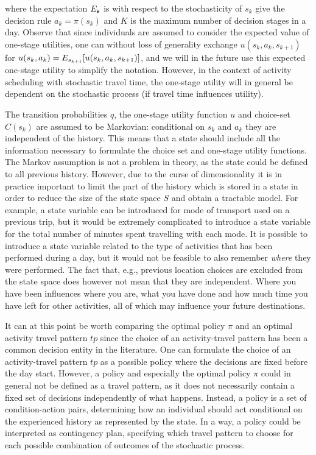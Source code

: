 where the expectation $E_{\mathbf{s}}$ is with respect to the stochasticity of $s_k$ give the decision rule $a_k=\pi({s_k})$ and $K$ is the maximum number of decision stages in a day. Observe that since individuals are assumed to consider the expected value of one-stage utilities, one can without loss of generality exchange $u(s_k,a_k,s_{k+1})$ for $u(s_k,a_k) = E_{s_{k+1}}[u(s_k,a_k,s_{k+1})]$, and we will in the future use this expected one-stage utility to simplify the notation. However, in the context of activity scheduling with stochastic travel time, the one-stage utility will in general be dependent on the stochastic process (if travel time influences utility).

The transition probabilities $q$, the one-stage utility function $u$ and choice-set $C(s_k)$ are assumed to be Markovian: conditional on $s_k$ and $a_k$ they are independent of the history. This means that a state should include all the information necessary to formulate the choice set and one-stage utility functions. The Markov assumption is not a problem in theory, as the state could be defined to all previous history. However, due to the curse of dimensionality it is in practice important to limit the part of the history which is stored in a state in order to reduce the size of the state space $S$ and obtain a tractable model. For example, a state variable can be introduced for mode of transport used on a previous trip, but it would be extremely complicated to introduce a state variable for the total number of minutes spent travelling with each mode. It is possible to introduce a state variable related to the type of activities that has been performed during a day, but it would not be feasible to also remember \emph{where} they were performed. The fact that, e.g., previous location choices are excluded from the state space does however not mean that they are independent. Where you have been influences where you are, what you have done and how much time you have left for other activities, all of which may influence your future destinations. 

It can at this point be worth comparing the optimal policy $\pi$ and an optimal activity travel pattern $tp$ since the choice of an activity-travel pattern has been a common decision entity in the literature. One can formulate the choice of an activity-travel pattern $tp$ as a possible policy where the decisions are fixed before the day start. However, a policy and especially the optimal policy $\pi$ could in general not be defined as a travel pattern, as it does not necessarily contain a fixed set of decisions independently of what happens. Instead, a policy is a set of condition-action pairs, determining how an individual should act conditional on the experienced history as represented by the state. In a way, a policy could be interpreted as contingency plan, specifying which travel pattern to choose for each possible combination of outcomes of the stochastic process.

